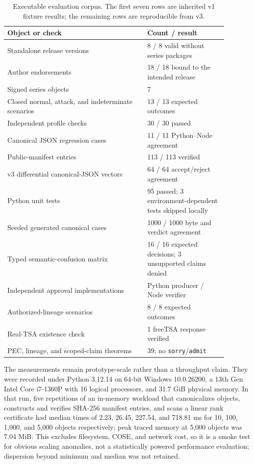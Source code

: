 \documentclass[11pt]{article}
\begin{document}
\begin{table}[H]
\centering
\caption{Executable evaluation corpus. The first seven rows are inherited v1 fixture results; the remaining rows are reproducible from v3.}
\begin{tabular}{p{0.57\linewidth}p{0.32\linewidth}}
\toprule
Object or check & Count / result \\
\midrule
Standalone release versions & 8 / 8 valid without series packages \\
Author endorsements & 18 / 18 bound to the intended release \\
Signed series objects & 7 \\
Closed normal, attack, and indeterminate scenarios & 13 / 13 expected outcomes \\
Independent profile checks & 30 / 30 passed \\
Canonical JSON regression cases & 11 / 11 Python--Node agreement \\
Public-manifest entries & 113 / 113 verified \\
v3 differential canonical-JSON vectors & 64 / 64 accept/reject agreement \\
Python unit tests & 95 passed; 3 environment-dependent tests skipped locally \\
Seeded generated canonical cases & 1000 / 1000 byte and verdict agreement \\
Typed semantic-confusion matrix & 16 / 16 expected decisions; 3 unsupported claims denied \\
Independent approval implementations & Python producer / Node verifier \\
Authorized-lineage scenarios & 8 / 8 expected outcomes \\
Real-TSA existence check & 1 freeTSA response verified \\
PEC, lineage, and scoped-claim theorems & 39; no \texttt{sorry}/\texttt{admit} \\
\bottomrule
\end{tabular}
\end{table}

The measurements remain prototype-scale rather than a throughput claim. They
were recorded under Python 3.12.14 on 64-bit Windows 10.0.26200, a 13th Gen
Intel Core i7-1360P with 16 logical processors, and 31.7 GiB physical memory.
In that run, five repetitions of an in-memory workload that canonicalizes
objects, constructs and verifies SHA-256 manifest entries, and scans a linear
rank certificate had median times of 2.23, 26.45, 227.54, and 718.81 ms for
10, 100, 1,000, and 5,000 objects respectively; peak traced memory at 5,000
objects was 7.04 MiB. This excludes filesystem, COSE, and network cost, so it
is a smoke test for obvious scaling anomalies, not a statistically powered
performance evaluation; dispersion beyond minimum and median was not retained.
\end{document}
